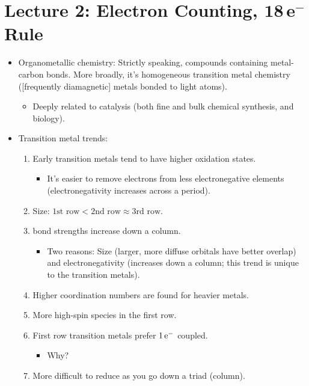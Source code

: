 \documentclass[../notes.tex]{subfiles}
\begin{document}
\section[Lecture 2: Electron Counting, \texorpdfstring{$18\,\text{e}^-$}{TEXT} Rule]{Lecture 2: Electron Counting, \texorpdfstring{$\bm{18\,\textbf{e}^-}$}{TEXT} Rule}
\begin{itemize}
    \item {}Organometallic chemistry: Strictly speaking, compounds containing metal-carbon bonds. More broadly, it's homogeneous transition metal chemistry ([frequently diamagnetic] metals bonded to light atoms).
    \begin{itemize}
        \item Deeply related to catalysis (both fine and bulk chemical synthesis, and biology).
    \end{itemize}
    \item Transition metal trends:
    \begin{enumerate}
        \item Early transition metals tend to have higher oxidation states.
        \begin{itemize}
            \item It's easier to remove electrons from less electronegative elements (electronegativity increases across a period).
        \end{itemize}
        \item Size: $\text{1st row}<\text{2nd row}\approx\text{3rd row}$.
        \item {} bond strengths increase down a column.
        \begin{itemize}
            \item Two reasons: Size (larger, more diffuse orbitals have better overlap) and electronegativity (increases down a column; this trend is unique to the transition metals).
        \end{itemize}
        \item Higher coordination numbers are found for heavier metals.
        \item More high-spin species in the first row.
        \item First row transition metals prefer $1\,\e[-]$ coupled.
        \begin{itemize}
            \item Why?
        \end{itemize}
        \item More difficult to reduce as you go down a triad (column).

\end{enumerate}
\end{itemize}
\end{document}
